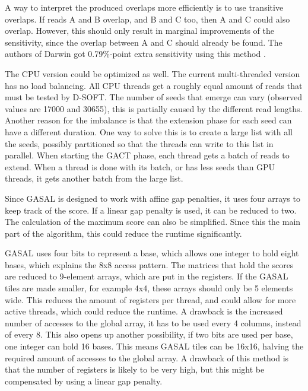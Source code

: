 \documentclass[../thesis.tex]{subfiles}
\begin{document}
A way to interpret the produced overlaps more efficiently is to use transitive overlaps.
If reads A and B overlap, and B and C too, then A and C could also overlap.
However, this should only result in marginal improvements of the sensitivity, since the overlap between A and C should already be found.
The authors of Darwin got 0.79\%-point extra sensitivity using this method \cite{Darwin1}.

The CPU version could be optimized as well.
The current multi-threaded version has no load balancing.
All CPU threads get a roughly equal amount of reads that must be tested by D-SOFT.
The number of seeds that emerge can vary (observed values are 17000 and 30655), this is partially caused by the different read lengths.
Another reason for the imbalance is that the extension phase for each seed can have a different duration.
One way to solve this is to create a large list with all the seeds, possibly partitioned so that the threads can write to this list in parallel.
When starting the GACT phase, each thread gets a batch of reads to extend.
When a thread is done with its batch, or has less seeds than GPU threads, it gets another batch from the large list.

Since GASAL is designed to work with affine gap penalties, it uses four arrays to keep track of the score.
If a linear gap penalty is used, it can be reduced to two.
The calculation of the maximum score can also be simplified.
Since this the main part of the algorithm, this could reduce the runtime significantly.

GASAL uses four bits to represent a base, which allows one integer to hold eight bases, which explains the 8x8 access pattern.
The matrices that hold the scores are reduced to 9-element arrays, which are put in the registers.
If the GASAL tiles are made smaller, for example 4x4, these arrays should only be 5 elements wide.
This reduces the amount of registers per thread, and could allow for more active threads, which could reduce the runtime.
A drawback is the increased number of accesses to the global array, it has to be used every 4 columns, instead of every 8.
This also opens up another possibility, if two bits are used per base, one integer can hold 16 bases.
This means GASAL tiles can be 16x16, halving the required amount of accesses to the global array.
A drawback of this method is that the number of registers is likely to be very high, but this might be compensated by using a linear gap penalty.
\end{document}
